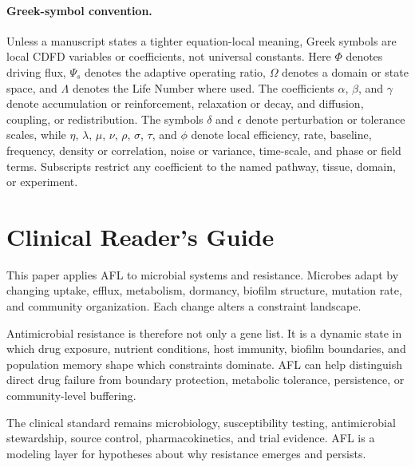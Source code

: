 \documentclass[11pt]{article}
\begin{document}
\paragraph{Greek-symbol convention.}
Unless a manuscript states a tighter equation-local meaning, Greek symbols are local CDFD variables or coefficients, not universal constants. Here $\Phi$ denotes driving flux, $\Psi_s$ denotes the adaptive operating ratio, $\Omega$ denotes a domain or state space, and $\Lambda$ denotes the Life Number where used. The coefficients $\alpha$, $\beta$, and $\gamma$ denote accumulation or reinforcement, relaxation or decay, and diffusion, coupling, or redistribution. The symbols $\delta$ and $\epsilon$ denote perturbation or tolerance scales, while $\eta$, $\lambda$, $\mu$, $\nu$, $\rho$, $\sigma$, $\tau$, and $\phi$ denote local efficiency, rate, baseline, frequency, density or correlation, noise or variance, time-scale, and phase or field terms. Subscripts restrict any coefficient to the named pathway, tissue, domain, or experiment.

\section*{Clinical Reader's Guide}
This paper applies AFL to microbial systems and resistance. Microbes adapt by changing uptake, efflux, metabolism, dormancy, biofilm structure, mutation rate, and community organization. Each change alters a constraint landscape.

Antimicrobial resistance is therefore not only a gene list. It is a dynamic state in which drug exposure, nutrient conditions, host immunity, biofilm boundaries, and population memory shape which constraints dominate. AFL can help distinguish direct drug failure from boundary protection, metabolic tolerance, persistence, or community-level buffering.

The clinical standard remains microbiology, susceptibility testing, antimicrobial stewardship, source control, pharmacokinetics, and trial evidence. AFL is a modeling layer for hypotheses about why resistance emerges and persists.


\vspace{0.5em}\noindent{}
\vspace{0.75em}
\end{document}
